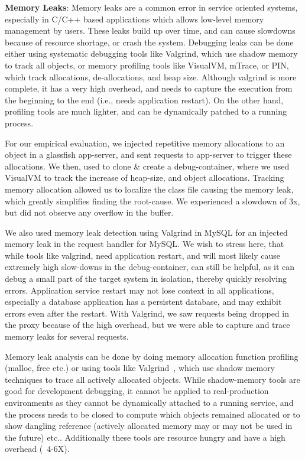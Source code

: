 \noindent
\textbf{Memory Leaks}: %
Memory leaks are a common error in service oriented systems, especially in C/C++ based applications which allows low-level memory management by users.
These leaks build up over time, and can cause slowdowns because of resource shortage, or crash the system.
Debugging leaks can be done either using systematic debugging tools like Valgrind, which use shadow memory to track all objects, or memory profiling tools like VisualVM, mTrace, or PIN, which track allocations, de-allocations, and heap size.
Although valgrind is more complete, it has a very high overhead, and needs to capture the execution from the beginning to the end (i.e., needs application restart).
On the other hand, profiling tools are much lighter, and can be dynamically patched to a running process.

For our empirical evaluation, we injected repetitive memory allocations to an object in a glassfish app-server, and sent requests to app-server to trigger these allocations.
We then, used \parikshan to clone \& create a debug-container, where we used VisualVM to track the increase of heap-size, and object allocations.
Tracking memory allocation allowed us to localize the class file causing the memory leak, which greatly simplifies finding the root-cause.
We experienced a slowdown of 3x, but did not observe any overflow in the buffer.

We also used memory leak detection using Valgrind in MySQL for an injected memory leak in the request handler for MySQL.
We wish to stress here, that while tools like valgrind, need application restart, and will most likely cause extremely high slow-downs in the debug-container, \parikshan can still be helpful, as it can debug a small part of the target system in isolation, thereby quickly resolving errors.
Application service restart may not lose context in all applications, especially a database application has a persistent database, and may exhibit errors even after the restart.
With Valgrind, we saw requests being dropped in the proxy because of the high overhead, but we were able to capture and trace memory leaks for several requests.


\iffalse
Memory leak analysis can be done by doing memory allocation function profiling (malloc, free etc.) or using tools like Valgrind~\cite{valgrind}, which use shadow memory techniques to trace all actively allocated objects.
While shadow-memory tools are good for development debugging, it cannot be applied to real-production environments as they cannot be dynamically attached to a running service, and the process needs to be closed to compute which objects remained allocated or to show dangling reference (actively allocated memory may or may not be used in the future) etc.. Additionally these tools are resource hungry and have a high overhead (~4-6X).

